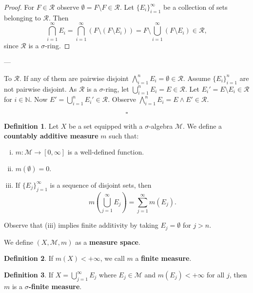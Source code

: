 \documentclass[11pt]{article}
\theoremstyle{definition}
\newtheorem{definition}{Definition}[section]
\theoremstyle{remark}
\begin{document}
\begin{proof}
For $F \in \mathcal{R}$ observe $\emptyset = F \setminus F \in \mathcal{R}$. Let $\{E_i\}_{i=1}^\infty$ be a collection of sets belonging to $\mathcal{R}$. Then
\[
\bigcap_{i=1}^\infty E_i = \bigcap_{i=1}^\infty \left(F \setminus (F \setminus E_i)\right) = F \setminus \bigcup_{i=1}^\infty (F \setminus E_i) \in \mathcal{R},
\]
since $\mathcal{R}$ is a $\sigma$-ring.
\end{proof}

---

To \(\mathcal{R}\). If any of them are pairwise disjoint
\(\bigwedge_{i=1}^n E_i = \emptyset \in \mathcal{R}\). Assume \(\{E_i\}_{i=1}^n\) are
not pairwise disjoint. As \(\mathcal{R}\) is a \(\sigma\)-ring, let
\(\bigcup_{i=1}^n E_i = E \in \mathcal{R}\). Let \(E_i' = E \setminus E_i \in \mathcal{R}\) for
\(i \in \mathbb{N}\). Now \(E' = \bigcup_{i=1}^n E_i' \in \mathcal{R}\). Observe
\(\bigwedge_{i=1}^n E_i = E \wedge E' \in \mathcal{R}\).

\[
\square
\]

\begin{definition}\label{def:measure}
Let $X$ be a set equipped with a $\sigma$-algebra $\mathcal{M}$. We define a \textbf{countably additive measure} $m$ such that:
\begin{enumerate}[(i)]
    \item $m: \mathcal{M} \to [0, \infty]$ is a well-defined function.
    \item $m(\emptyset) = 0$.
    \item If $\{E_j\}_{j=1}^{\infty}$ is a sequence of disjoint sets, then
    \[
    m\left(\bigcup_{j=1}^{\infty} E_j\right) = \sum_{j=1}^{\infty} m(E_j).
    \]
\end{enumerate}
Observe that (iii) implies finite additivity by taking $E_j = \emptyset$ for $j > n$.
\end{definition}

We define $(X, \mathcal{M}, m)$ as a \textbf{measure space}.

\begin{definition}\label{def:finite_measure}
If $m(X) < +\infty$, we call $m$ a \textbf{finite measure}.
\end{definition}

\begin{definition}\label{def:sigma_finite_measure}
If $X = \bigcup_{j=1}^{\infty} E_j$ where $E_j \in \mathcal{M}$ and $m(E_j) < +\infty$ for all $j$, then $m$ is a \textbf{$\sigma$-finite measure}.
\end{definition}
\end{document}
